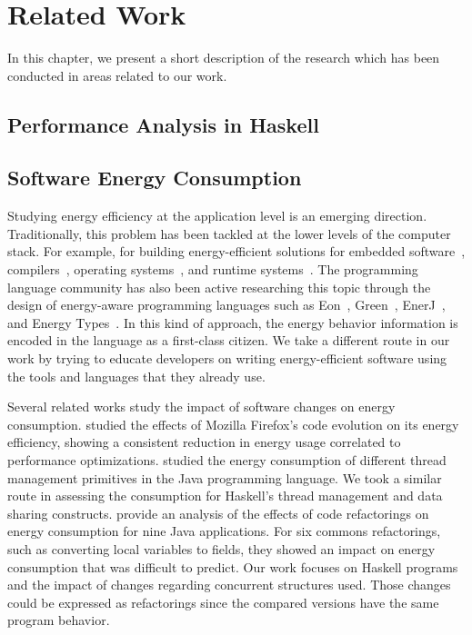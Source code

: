 \chapter{Related Work}\label{chp:related}
In this chapter, we present a short description of the research which has been conducted in areas related to our work.


\section{Performance Analysis in Haskell}


\section{Software Energy Consumption}
Studying energy efficiency at the application level is an emerging direction. Traditionally, this problem has been tackled at the lower levels of the computer stack. For example, for building energy-efficient solutions for embedded software~\cite{tiwari:1994}, compilers~\cite{hsu:2003}, operating systems~\cite{merkel:2006}, and runtime systems~\cite{ribic:2014, farkas:2000}. The programming language community has also been active researching this topic through the design of energy-aware programming languages such as Eon~\cite{sorber:2007}, Green~\cite{baek:2010}, EnerJ~\cite{sampson:2011}, and Energy Types~\cite{cohen:2012}. In this kind of approach, the energy behavior information is encoded in the language as a first-class citizen. We take a different route in our work by trying to educate developers on writing energy-efficient software using the tools and languages that they already use.

Several related works study the impact of software changes on energy consumption.  studied the effects of Mozilla Firefox's code evolution on its energy efficiency, showing a consistent reduction in energy usage correlated to performance optimizations.  studied the energy consumption of different thread management primitives in the Java programming language. We took a similar route in assessing the consumption for Haskell's thread management and data sharing constructs.  provide an analysis of the effects of code refactorings on energy consumption for nine Java applications. For six commons refactorings, such as converting local variables to fields, they showed an impact on energy consumption that was difficult to predict. Our work focuses on Haskell programs and the impact of changes regarding concurrent structures used. Those changes could be expressed as refactorings since the compared versions have the same program behavior.

